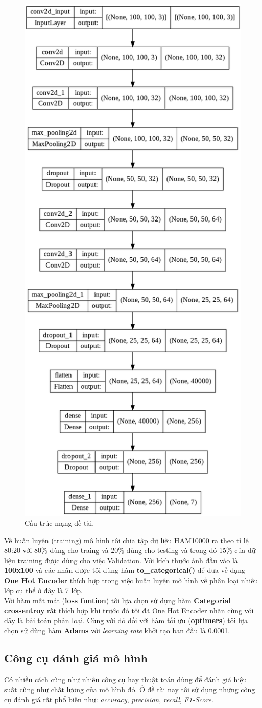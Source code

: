 \documentclass[12pt,a4paper]{article}
\begin{document}
	\noindent
	\begin{figure}[h!]
		\centering
		\includegraphics[width=0.35\linewidth]{./images/cautrucmang.png}
		\caption{Cấu trúc mạng đề tài.}
		\label{fig:cauTrucMang}
	\end{figure}
	
	\noindent
	Về huấn luyện (training) mô hình tôi chia tập dữ liệu HAM10000 ra theo tỉ lệ 80:20 với 80\% dùng cho traing và 20\% dùng cho testing và trong đó 15\% của dữ liệu training được dùng cho việc Validation. Với kích thước ảnh đầu vào là \textbf{100x100} và các nhãn được tôi dùng hàm \textbf{to\_categorical()} để đưa về dạng \textbf{One Hot Encoder} thích hợp trong việc huấn luyện mô hình về phân loại nhiều lớp cụ thể ở đây là 7 lớp.\\
	
	\noindent
	Với hàm mất mát (\textbf{loss funtion}) tôi lựa chọn sử dụng hàm \textbf{Categorial crossentroy} rất thích hợp khi trước đó tôi đã One Hot Encoder nhãn cùng với đây là bài toán phân loại. Cùng với đó đối với hàm tối ưu (\textbf{optimers}) tôi lựa chọn sử dùng hàm \textbf{Adams} với \textit{learning rate} khởi tạo ban đầu là 0.0001.
	
	\subsection{Công cụ đánh giá mô hình}
	Có nhiều cách cũng như nhiều công cụ hay thuật toán dùng để đánh giá hiệu suất cũng như chất lương của mô hình đó. Ở đề tài nay tôi sử dụng những công cụ đánh giá rất phổ biến như: \textit{accuracy}, \textit{precision}, \textit{recall}, \textit{F1-Score}.\\
	
\end{document}
